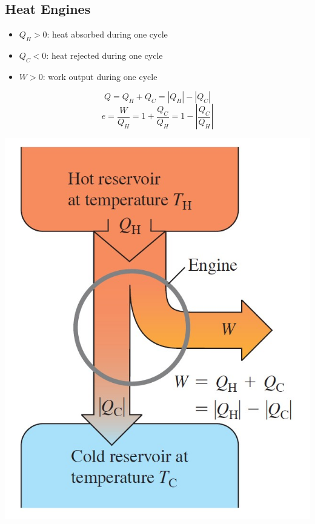 \documentclass{article}
\begin{document}
\subsection{Heat Engines}
\begin{itemize}
    \item $Q_H>0$: heat absorbed during one cycle 
    \item $Q_C<0$: heat rejected during one cycle 
    \item $W>0$: work output during one cycle 
\end{itemize}
\[Q=Q_H+Q_C=|Q_H|-|Q_C|\]
\[e=\frac{W}{Q_H}=1+\frac{Q_C}{Q_H}=1-\left|\frac{Q_C}{Q_H}\right|\]
\begin{center}
    \includegraphics[scale=0.2]{images/heat_engine_energy_flow.jpg}
\end{center}
\end{document}
